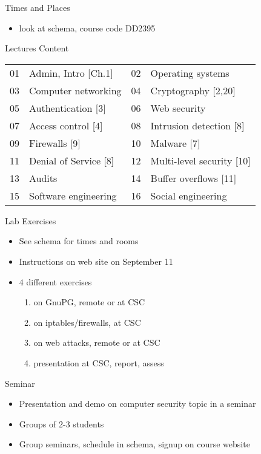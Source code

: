 \documentclass{beamer}
\begin{document}
\begin{frame}{Times and Places}
  \begin{itemize}
    \item look at schema, course code DD2395
  \end{itemize}
\end{frame}

\begin{frame}{Lectures Content}
  \begin{tabular}{cl|cl}
    01 & Admin, Intro [Ch.1] &
    02 & Operating systems \\
    03 & Computer networking &
    04 & Cryptography [2,20] \\
    05 & Authentication [3] &
    06 & Web security \\
    07 & Access control [4] &
    08 & Intrusion detection [8] \\
    09 & Firewalls [9] &
    10 & Malware [7] \\
    11 & Denial of Service [8] &
    12 & Multi-level security [10] \\
    13 & Audits &
    14 & Buffer overflows [11] \\
    15 & Software engineering &
    16 & Social engineering
  \end{tabular}
\end{frame}

\begin{frame}{Lab Exercises}
  \begin{itemize}
    \item See schema for times and rooms
    \item Instructions on web site on September 11
    \item 4 different exercises
      \begin{enumerate}
        \item on GnuPG, remote or at CSC
        \item on iptables/firewalls, at CSC
        \item on web attacks, remote or at CSC
        \item presentation at CSC, report, assess
      \end{enumerate}
  \end{itemize}
\end{frame}

\begin{frame}{Seminar}
  \begin{itemize}
    \item Presentation and demo on computer security 
      topic in a seminar
    \item Groups of 2-3 students
    \item Group seminars, schedule in schema, 
      signup on course website
  \end{itemize}
\end{frame}
\end{document}
